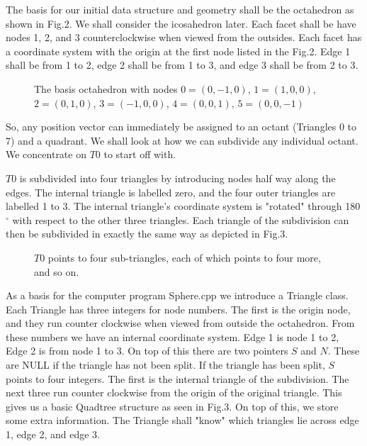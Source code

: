 \documentclass[12pt]{article}
\begin{document}
The basis for our initial  data structure and geometry shall be the octahedron 
as shown in Fig.2. We shall consider the icosahedron later.
Each facet shall be have nodes 1, 2, and 3 counterclockwise when viewed
from the outsides. Each facet has a coordinate system with the origin
at the first node listed in the Fig.2. Edge 1 shall be from 1 to 2,
 edge 2 shall be from 1 to 3, and edge 3 shall be from 2 to 3.

\vspace*{10cm}
\begin{figure}[htb]
\caption{ 
The basis octahedron with nodes $0=(0,-1,0)$, $1=(1,0,0)$, $2=(0,1,0)$,
 $3=(-1,0,0)$, $4=(0,0,1)$, $5=(0,0,-1)$
}
\end{figure}

So, any position vector can immediately be assigned to an octant (Triangles
0 to 7) and a quadrant. We shall look at how we can subdivide any individual
octant. We concentrate on $T0$ to start off with.

$T0$ is subdivided into four triangles by introducing nodes half way along the edges.
The internal triangle is labelled zero, and the four outer triangles are labelled
1 to 3. The internal triangle's coordinate system is "rotated" through 180$^\circ$
with respect to the other three triangles. Each triangle of the subdivision can then
be subdivided in exactly the same way as depicted in Fig.3.
\vspace*{10cm}
\begin{figure}[htb]
\caption{ 
	$T0$ points to four sub-triangles, each of which points to four more, and so on.
}
\end{figure}

As a basis for the computer program Sphere.cpp we introduce a Triangle class.
Each Triangle has three integers for node numbers. The first is the origin node,
and they run counter clockwise when viewed from outside the octahedron. 
From these numbers we have an internal coordinate
system. Edge 1 is node 1 to 2, Edge 2 is from node 1 to 3.
On top of this there are two pointers $S$ and $N$.
These are NULL if the triangle has not been split. If the triangle has been split,
$S$ points to four integers. The first is the internal triangle of the subdivision.
The next three run counter clockwise from the origin of the original triangle.
This gives us a basic Quadtree structure as seen in Fig.3. 
On top of this, we store some extra information. The Triangle shall "know"
which triangles lie across edge 1, edge 2, and edge 3. 
\end{document}
